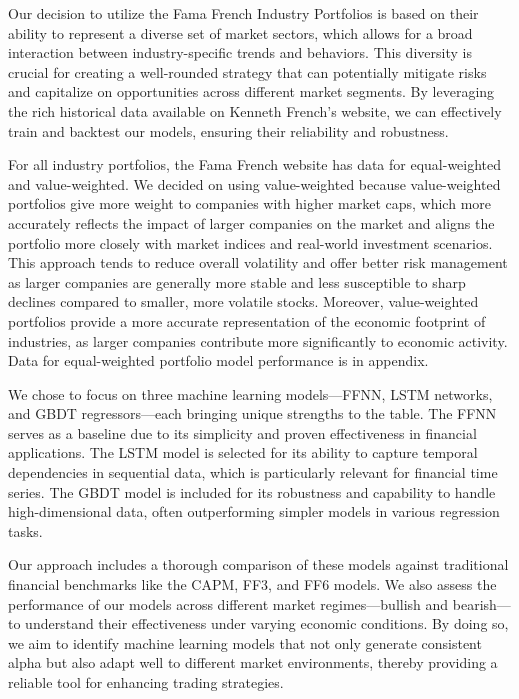 \documentclass{article}
\begin{document}
Our decision to utilize the Fama French Industry Portfolios is based on their ability to represent a diverse set of market sectors, which allows for a broad interaction between industry-specific trends and behaviors. This diversity is crucial for creating a well-rounded strategy that can potentially mitigate risks and capitalize on opportunities across different market segments. By leveraging the rich historical data available on Kenneth French's website, we can effectively train and backtest our models, ensuring their reliability and robustness.

For all industry portfolios, the Fama French website has data for equal-weighted and value-weighted. We decided on using value-weighted because value-weighted portfolios give more weight to companies with higher market caps, which more accurately reflects the impact of larger companies on the market and aligns the portfolio more closely with market indices and real-world investment scenarios. This approach tends to reduce overall volatility and offer better risk management as larger companies are generally more stable and less susceptible to sharp declines compared to smaller, more volatile stocks. Moreover, value-weighted portfolios provide a more accurate representation of the economic footprint of industries, as larger companies contribute more significantly to economic activity. Data for equal-weighted portfolio model performance is in appendix.

We chose to focus on three machine learning models—FFNN, LSTM networks, and GBDT regressors—each bringing unique strengths to the table. The FFNN serves as a baseline due to its simplicity and proven effectiveness in financial applications. The LSTM model is selected for its ability to capture temporal dependencies in sequential data, which is particularly relevant for financial time series. The GBDT model is included for its robustness and capability to handle high-dimensional data, often outperforming simpler models in various regression tasks.

Our approach includes a thorough comparison of these models against traditional financial benchmarks like the CAPM, FF3, and FF6 models. We also assess the performance of our models across different market regimes—bullish and bearish—to understand their effectiveness under varying economic conditions. By doing so, we aim to identify machine learning models that not only generate consistent alpha but also adapt well to different market environments, thereby providing a reliable tool for enhancing trading strategies.
\end{document}

